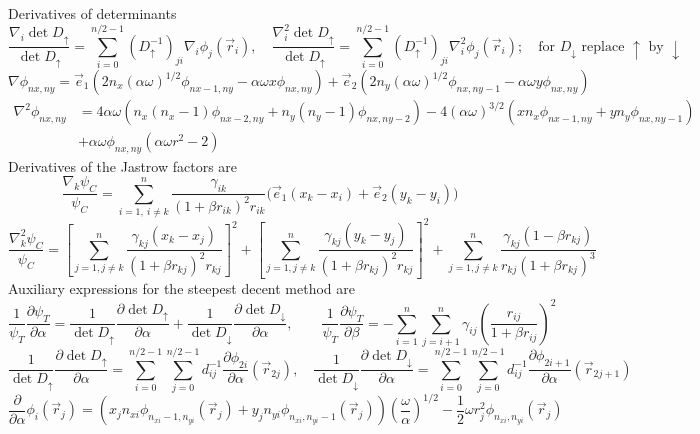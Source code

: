 \documentclass[11pt,english,a4paper]{article}
\begin{document}
Derivatives of determinants
\[
\frac{\nabla_i \det D_\uparrow}{\det D_\uparrow} = \sum_{i = 0}^{n/2-1} (D_\uparrow^{-1})_{ji} \nabla_i \phi_{j}(\vec{r}_i), \quad \frac{\nabla_i^2 \det D_\uparrow}{\det D_\uparrow} = \sum_{i = 0}^{n/2-1} (D_\uparrow^{-1})_{ji} \nabla_i^2 \phi_{j}(\vec{r}_i); \quad \text{for $D_\downarrow$ replace $\uparrow$ by $\downarrow$}
\]
\[
\nabla \phi_{  nx,ny} = \vec{e}_1 \left( 2n_x (\alpha \omega)^{1/2} \phi_{  nx-1,ny} - \alpha \omega x \phi_{  nx,ny} \right) + \vec{e}_2 \left( 2n_y(\alpha\omega)^{1/2} \phi_{  nx,ny-1} - \alpha \omega y \phi_{  nx,ny} \right)
\]
\begin{align*}
\nabla^2 \phi_{  nx,ny} &= 4 \alpha \omega \left( n_x (n_x - 1)\phi_{  nx-2,ny} + n_y(n_y - 1)\phi_{  nx,ny-2} \right)  -4 (\alpha \omega)^{3/2} \left( x n_x\phi_{  nx-1,ny} + yn_y \phi_{  nx,ny-1} \right) \\
&+ \alpha \omega \phi_{  nx,ny}\left( \alpha\omega r^2 - 2 \right)
\end{align*}
Derivatives of the Jastrow factors are
\[
\frac{\nabla_k \psi_C}{\psi_C} = \sum_{  i=1, \ i \neq k}^n \frac{\gamma_{ik}}{(1 + \beta r_{ik})^2 r_{ik}} \Big( \vec e_1 (x_k -x_i) + \vec e_2 (y_k -y_i) \Big)
\]
\[
\frac{\nabla^2_k \psi_C}{\psi_C} = \left[ \sum_{j=1, j \neq k}^n \frac{\gamma_{kj}(x_k-x_j) }{(1 + \beta r_{kj})^2 r_{kj}} \right]^2 + \left[ \sum_{j=1, j \neq k}^n \frac{\gamma_{kj}(y_k-y_j) }{(1 + \beta r_{kj})^2 r_{kj}} \right]^2 + \sum_{j=1, j \neq k}^n \frac{\gamma_{kj}(1 - \beta r_{kj}) }{r_{kj} (1 + \beta r_{kj})^3}
\]
Auxiliary expressions for the steepest decent method are
\[
\frac{1}{\psi_T}\frac{\partial\psi_T}{\partial \alpha} = \frac{1}{\det D_\uparrow}\frac{\partial \det D_\uparrow}{\partial \alpha} + \frac{1}{\det D_\downarrow}\frac{\partial \det D_\downarrow}{\partial \alpha}, \qquad \frac{1}{\psi_T}\frac{\partial\psi_T}{\partial \beta} = - \sum_{i=1}^n\sum_{j=i+1}^n \gamma_{ij} \left( \frac{r_{ij}}{1 + \beta r_{ij}} \right)^2
\]
\[
\frac{1}{\det D_\uparrow}\frac{\partial \det D_\uparrow}{\partial \alpha} = \sum_{i=0}^{n/2-1}\sum_{j=0}^{n/2-1} d^{-1}_{ij} \frac{\partial \phi_{2i}}{\partial \alpha} (\vec{r}_{2j}), \quad \frac{1}{\det D_\downarrow}\frac{\partial \det D_\downarrow}{\partial \alpha} = \sum_{i=0}^{n/2-1}\sum_{j=0}^{n/2-1} d^{-1}_{ij} \frac{\partial \phi_{2i+1}}{\partial \alpha}(\vec{r}_{2j+1} )
\]
\[
\frac{\partial}{\partial \alpha} \phi_{i} (\vec{r}_j) = \left( x_j n_{xi} \phi_{n_{xi}-1,n_{yi}} (\vec{r}_j) + y_j n_{yi} \phi_{n_{xi},n_{yi}-1} (\vec{r}_j) \right)\left( \frac{\omega}{\alpha} \right)^{1/2} - \frac{1}{2}\omega r_j^2 \phi_{n_{xi},n_{yi}} (\vec{r}_j)
\]
\end{document}
